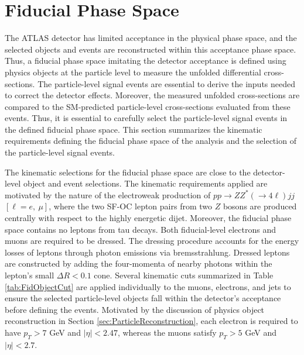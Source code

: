 \section{Fiducial Phase Space}
\label{sec:FidSel}

The ATLAS detector has limited acceptance in the physical phase space, and the selected objects and events are reconstructed within this acceptance phase space. Thus, a fiducial phase space imitating the detector acceptance is defined using physics objects at the particle level to measure the unfolded differential cross-sections. The particle-level signal events are essential to derive the inputs needed to correct the detector effects. Moreover, the measured unfolded cross-sections are compared to the SM-predicted particle-level cross-sections evaluated from these events. Thus, it is essential to carefully select the particle-level signal events in the defined fiducial phase space. This section summarizes the kinematic requirements defining the fiducial phase space of the analysis and the selection of the particle-level signal events. 

The kinematic selections for the fiducial phase space are close to the detector-level object and event selections. The kinematic requirements applied are motivated by the nature of the electroweak production of $pp\rightarrow ZZ^* ( \rightarrow 4\ell) jj$ $[\ell = e,~\mu]$, where the two SF-OC lepton pairs from two $Z$ bosons are produced centrally with respect to the highly energetic dijet. Moreover, the fiducial phase space contains no leptons from tau decays. Both fiducial-level electrons and muons are required to be dressed. The dressing procedure accounts for the energy losses of leptons through photon emissions via bremsstrahlung. Dressed leptons are constructed by adding the four-momenta of nearby photons within the lepton's small $\Delta R < 0.1$ cone. Several kinematic cuts summarized in Table \ref{tab:FidObjectCut} are applied individually to the muons, electrons, and jets to ensure the selected particle-level objects fall within the detector's acceptance before defining the events. Motivated by the discussion of physics object reconstruction in Section \ref{sec:ParticleReconstruction}, each electron is required to have $p_{T} > 7$ GeV and $|\eta| < 2.47$, whereas the muons satisfy $p_{T} > 5$ GeV and $|\eta| < 2.7$. 

